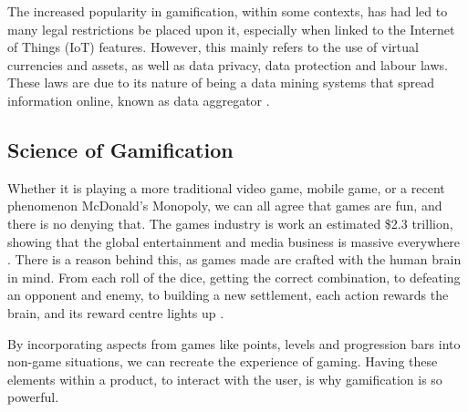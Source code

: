 \documentclass[sigchi]{acmart}
\begin{document}
The increased popularity in gamification, within some contexts, has had led to many legal restrictions be placed upon it, especially when linked to the Internet of Things (IoT) features. However, this mainly refers to the use of virtual currencies and assets, as well as data privacy, data protection and labour laws. These laws are due to its nature of being a data mining systems that spread information online, known as data aggregator \cite{10, 11}. 



\subsection{Science of Gamification}


Whether it is playing a more traditional video game, mobile game, or a recent phenomenon McDonald's Monopoly, we can all agree that games are fun, and there is no denying that.  The games industry is work an estimated \$2.3 trillion, showing that the global entertainment and media business is massive everywhere \cite{12}. There is a reason behind this, as games made are crafted with the human brain in mind. From each roll of the dice, getting the correct combination, to defeating an opponent and enemy, to building a new settlement, each action rewards the brain, and its reward centre lights up \cite{13}. 

By incorporating aspects from games like points, levels and progression bars into non-game situations, we can recreate the experience of gaming. Having these elements within a product, to interact with the user, is why gamification is so powerful. 
\end{document}
